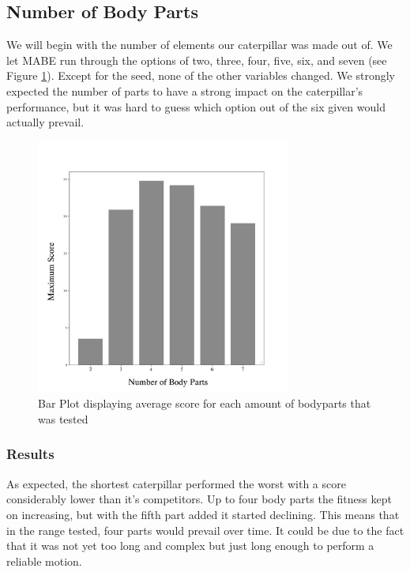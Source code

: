 \documentclass[12pt,oneside,listof=totoc,paper=a4,headings=small]{scrbook}
\begin{document}
\newpage

\subsection{Number of Body Parts}
We will begin with the number of elements our caterpillar was made out of. We let MABE run through the options of two, three, four, five, six, and seven (see Figure \ref{fig:parts_bars}). Except for the seed, none of the other variables changed. We strongly expected the number of parts to have a strong impact on the caterpillar's performance, but it was hard to guess which option out of the six given would actually prevail. 

\begin{figure}[h!]
\centering
\includegraphics[width=0.75\textwidth,height=0.75\textheight,keepaspectratio]{images/parts-bars.png}
\caption{Bar Plot displaying average score for each amount of bodyparts that was tested}
\label{fig:parts_bars}
\end{figure}

\subsubsection{Results}
As expected, the shortest caterpillar performed the worst with a score considerably lower than it's competitors. Up to four body parts the fitness kept on increasing, but with the fifth part added it started declining. This means that in the range tested, four parts would prevail over time. It could be due to the fact that it was not yet too long and complex but just long enough to perform a reliable motion.
\end{document}
